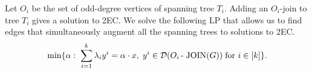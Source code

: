 Let $O_i$ be the set of odd-degree vertices of spanning tree $T_i$.
Adding an $O_i$-join to tree $T_i$ gives a solution to 2EC.
We solve the following LP that allows us to find edges that simultaneously augment all the spanning trees to solutions to 2EC.
\begin{equation}\label{ojoinaverage}
\min \{ \alpha:\;\sum_{i=1}^{k} \lambda_i y^i = \alpha \cdot x,\;  y^i \in \operatorname{\mathcal{D}}(O_i\operatorname{-\;JOIN}(G)) \; \mbox{for $i\in [k]$}\}.
\end{equation}
